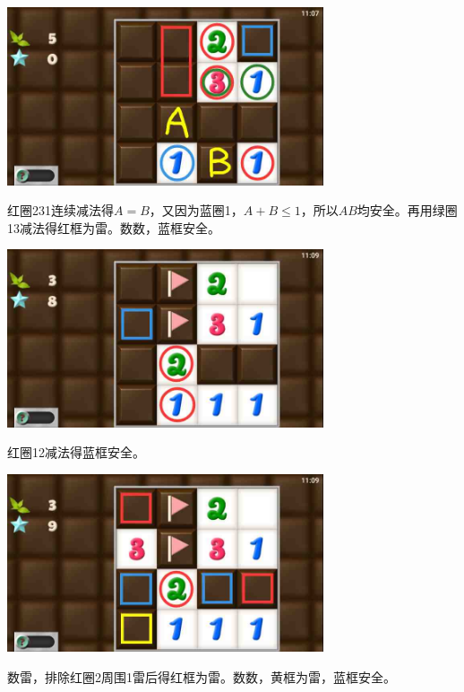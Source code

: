 \subsection{} %
\begin{center}
    \includegraphics[width=0.7\textwidth]{puzzlelow/127-1.jpg}
\end{center}
红圈231连续减法得$A=B$，又因为蓝圈1，$A+B\le 1$，所以$AB$均安全。再用绿圈13减法得红框为雷。数数，蓝框安全。
\begin{center}
    \includegraphics[width=0.7\textwidth]{puzzlelow/127-2.jpg}
\end{center}
红圈12减法得蓝框安全。
\begin{center}
    \includegraphics[width=0.7\textwidth]{puzzlelow/127-3.jpg}
\end{center}
数雷，排除红圈2周围1雷后得红框为雷。数数，黄框为雷，蓝框安全。

